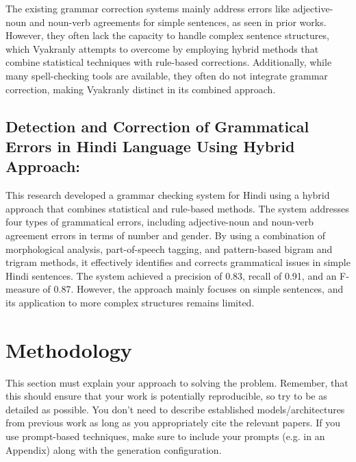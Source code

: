 \documentclass[11pt,a4paper]{article}
\begin{document}
The existing grammar correction systems mainly address errors like adjective-noun and noun-verb agreements for simple sentences, as seen in prior works. However, they often lack the capacity to handle complex sentence structures, which Vyakranly attempts to overcome by employing hybrid methods that combine statistical techniques with rule-based corrections. Additionally, while many spell-checking tools are available, they often do not integrate grammar correction, making Vyakranly distinct in its combined approach. \cite{s_vyakranly_2023}

\subsection{Detection and Correction of Grammatical Errors in Hindi Language Using Hybrid Approach:} 
This research developed a grammar checking system for Hindi using a hybrid approach that combines statistical and rule-based methods. The system addresses four types of grammatical errors, including adjective-noun and noun-verb agreement errors in terms of number and gender. By using a combination of morphological analysis, part-of-speech tagging, and pattern-based bigram and trigram methods, it effectively identifies and corrects grammatical issues in simple Hindi sentences. The system achieved a precision of 0.83, recall of 0.91, and an F-measure of 0.87. However, the approach mainly focuses on simple sentences, and its application to more complex structures remains limited. \cite{mittal_detection_2019}
\section{Methodology}

This section must explain your approach to solving the problem. Remember, that this should ensure that your work is potentially reproducible, so try to be as detailed as possible. You don't need to describe established models/architectures from previous work as long as you appropriately cite the relevant papers. If you use prompt-based techniques, make sure to include your prompts (e.g. in an Appendix) along with the generation configuration.
\end{document}
